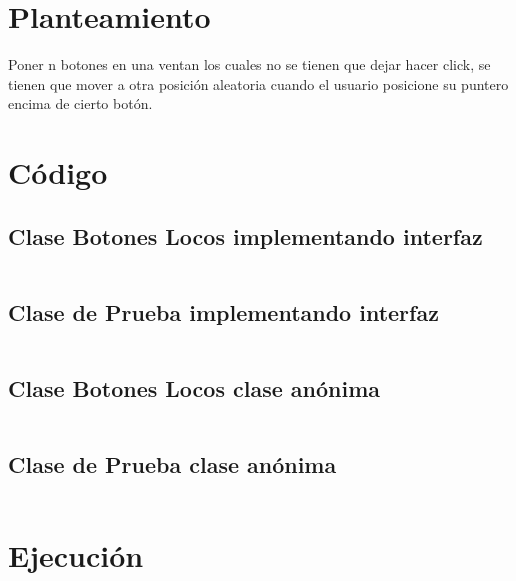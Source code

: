 \documentclass[12pt]{article}
\author{Pablo Vargas Bermúdez}
\begin{document}
\pagestyle{empty}

\section*{Planteamiento}

Poner n botones en una ventan los cuales no se tienen que dejar hacer
click, se tienen que mover a otra posición aleatoria cuando el usuario
posicione su puntero encima de cierto botón.

\section*{Código}

\subsection*{Clase Botones Locos implementando interfaz}
\inputminted{Java}{CrazyButtons.java}

\subsection*{Clase de Prueba implementando interfaz}
\inputminted{Java}{Prueba.java}

\subsection*{Clase Botones Locos clase anónima}
\inputminted{Java}{CrazyButtonsAnonima.java}

\subsection*{Clase de Prueba clase anónima}
\inputminted{Java}{PruebaAnonima.java}

\section*{Ejecución}
\end{document}
